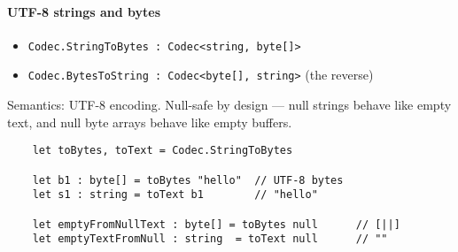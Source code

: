 \documentclass{article}
\begin{document}
\paragraph{UTF-8 strings and bytes}
\begin{itemize}
  \item \texttt{Codec.StringToBytes : Codec<string, byte[]>}
  \item \texttt{Codec.BytesToString : Codec<byte[], string>} (the reverse)
\end{itemize}
Semantics: UTF-8 encoding. Null-safe by design — null strings behave like empty text, and null byte arrays behave like empty buffers.
\begin{verbatim}
    let toBytes, toText = Codec.StringToBytes

    let b1 : byte[] = toBytes "hello"  // UTF-8 bytes
    let s1 : string = toText b1        // "hello"

    let emptyFromNullText : byte[] = toBytes null      // [||]
    let emptyTextFromNull : string  = toText null      // ""
\end{verbatim}
\end{document}

